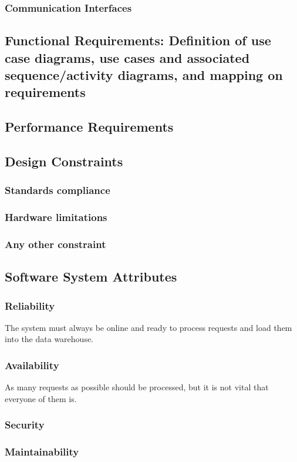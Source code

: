 \documentclass[12pt,a4paper]{article}
\begin{document}
\subsubsection{Communication	Interfaces}
\subsection{Functional	 Requirements:	 Definition	 of	 use	 case	 diagrams,	 use	 cases	 and	 associated	
sequence/activity	diagrams,	and	mapping	on	requirements} 
\subsection{Performance	Requirements} 
\subsection{Design	Constraints}
\subsubsection{Standards	compliance}
\subsubsection{Hardware	limitations}
\subsubsection{Any	other	constraint} 
\subsection{Software	System	Attributes} 
\subsubsection{Reliability}
The system must always be online and ready to process requests and load them into the data warehouse.
\subsubsection{Availability}
As many requests as possible should be processed, but it is not vital that everyone of them is.
\subsubsection{Security}
\subsubsection{Maintainability}
\end{document}

